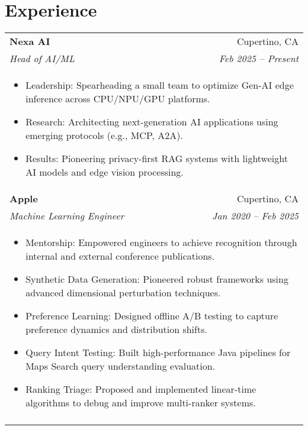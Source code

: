 \documentclass[letterpaper,11pt]{article}
\begin{document}
\section{Experience}
\begin{tabular*}{0.97\textwidth}[t]{l@{\extracolsep{\fill}}r}
  \textbf{Nexa AI} & Cupertino, CA \\
  \textit{\small Head of AI/ML} & \textit{\small Feb 2025 -- Present} \\
  \multicolumn{2}{l}{
    \begin{minipage}{\textwidth}
      \vspace{0.3em}
      \begin{itemize}[leftmargin=*, itemsep=-4.5pt, topsep=0pt, label={\raisebox{0.4ex}{\tiny\textbullet}}]
        \item  Leadership: Spearheading a small team to optimize Gen-AI edge inference across CPU/NPU/GPU platforms.
        \item  Research: Architecting next-generation AI applications using emerging protocols (e.g., MCP, A2A). %
        \item  Results: Pioneering privacy-first RAG systems with lightweight AI models and edge vision processing. %
      \end{itemize}
    \end{minipage}
  } \\
  \noalign{\vspace{0.7em}}

  \textbf{Apple} & Cupertino, CA \\
  \textit{\small Machine Learning Engineer} & \textit{\small Jan 2020 -- Feb 2025} \\
  \multicolumn{2}{l}{
    \begin{minipage}{\textwidth}
      \vspace{0.3em}
      \begin{itemize}[leftmargin=*, itemsep=-4.5pt, topsep=0pt, label={\raisebox{0.4ex}{\tiny\textbullet}}]       
        \item  Mentorship: Empowered engineers to achieve recognition through internal and external conference publications.
        \item  Synthetic Data Generation: Pioneered robust frameworks using advanced dimensional perturbation techniques. %
        \item  Preference Learning: Designed offline A/B testing to capture preference dynamics and distribution shifts. %
        \item  Query Intent Testing: Built high-performance Java pipelines for Maps Search query understanding evaluation. 
        \item  Ranking Triage: Proposed and implemented linear-time algorithms to debug and improve multi-ranker systems. %
      \end{itemize}
    \end{minipage}
  } \\
  \noalign{\vspace{0.7em}}


\end{tabular*}
\end{document}
